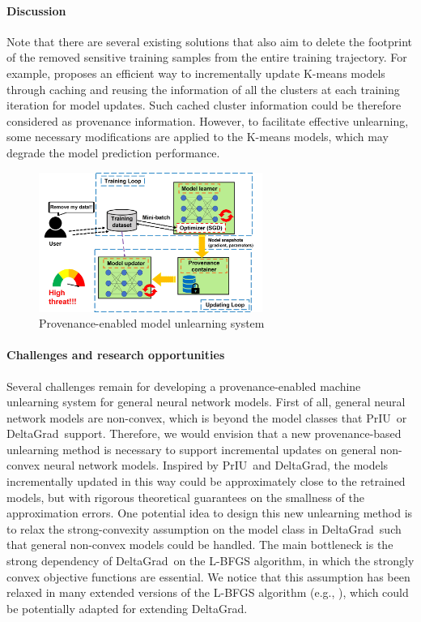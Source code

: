 \documentclass[11pt]{article}
\newcommand{\priu}{PrIU}
\newcommand{\deltagrad}{DeltaGrad}
\begin{document}
\paragraph*{Discussion} Note that 
there are several existing solutions that also aim to delete the footprint of the removed sensitive training samples from the entire training trajectory. For example, \cite{ginart2019making} proposes an efficient way to incrementally update K-means models through caching and reusing the information of all the clusters at each training iteration for model updates. Such cached cluster information could be therefore considered as provenance information. However, to facilitate effective unlearning, some necessary modifications are applied to the K-means models, which may degrade the model prediction performance.


\begin{figure}
    \centering
    \includegraphics[width=0.65\textwidth, height = 0.4\textwidth, bb=0pt 0pt 700pt 500pt]{figs/pipeline.jpg}
    \caption{Provenance-enabled model unlearning system}
    \label{fig: provenance_enabled_pipeline}
\end{figure}


\paragraph*{Challenges and research opportunities} Several challenges remain for developing a provenance-enabled machine unlearning system for general neural network models. First of all, general neural network models are non-convex, which is beyond the model classes that \priu\ or \deltagrad\ support. Therefore, we would envision that a new provenance-based unlearning method is necessary to support incremental updates on general non-convex neural network models. Inspired by \priu\ and \deltagrad, the models incrementally updated in this way could be approximately close to the retrained models, but with rigorous theoretical guarantees on the smallness of the approximation errors. One potential idea to design this new unlearning method is to relax the strong-convexity assumption on the model class in \deltagrad\ such that general non-convex models could be handled. The main bottleneck is the strong dependency of \deltagrad\ on the L-BFGS algorithm, in which the strongly convex objective functions are essential. We notice that this assumption has been relaxed in many extended versions of the L-BFGS algorithm (e.g., \cite{li2001modified}), which could be potentially adapted for extending \deltagrad. 
\end{document}
